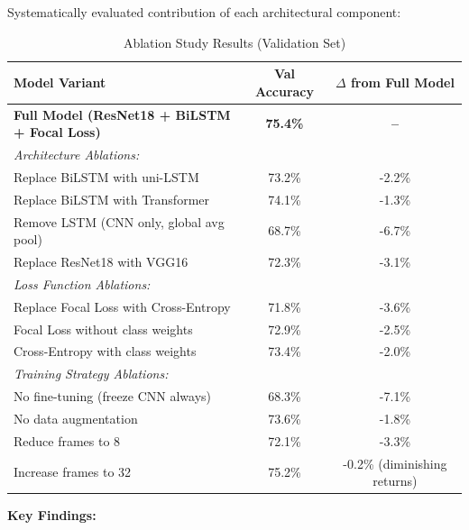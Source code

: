 \documentclass[11pt,a4paper]{article}
\begin{document}
Systematically evaluated contribution of each architectural component:

\begin{table}[H]
\centering
\caption{Ablation Study Results (Validation Set)}
\begin{tabular}{lcc}
\toprule
Model Variant & Val Accuracy & $\Delta$ from Full Model \\
\midrule
\textbf{Full Model (ResNet18 + BiLSTM + Focal Loss)} & \textbf{75.4\%} & \textbf{--} \\
\midrule
\textit{Architecture Ablations:} & & \\
\quad Replace BiLSTM with uni-LSTM & 73.2\% & -2.2\% \\
\quad Replace BiLSTM with Transformer & 74.1\% & -1.3\% \\
\quad Remove LSTM (CNN only, global avg pool) & 68.7\% & -6.7\% \\
\quad Replace ResNet18 with VGG16 & 72.3\% & -3.1\% \\
\midrule
\textit{Loss Function Ablations:} & & \\
\quad Replace Focal Loss with Cross-Entropy & 71.8\% & -3.6\% \\
\quad Focal Loss without class weights & 72.9\% & -2.5\% \\
\quad Cross-Entropy with class weights & 73.4\% & -2.0\% \\
\midrule
\textit{Training Strategy Ablations:} & & \\
\quad No fine-tuning (freeze CNN always) & 68.3\% & -7.1\% \\
\quad No data augmentation & 73.6\% & -1.8\% \\
\quad Reduce frames to 8 & 72.1\% & -3.3\% \\
\quad Increase frames to 32 & 75.2\% & -0.2\% (diminishing returns) \\
\bottomrule
\end{tabular}
\end{table}

\textbf{Key Findings:}
\end{document}
